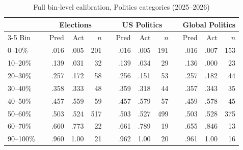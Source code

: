 \documentclass[11pt,a4paper]{article}
\begin{document}
\begin{table}[H]
\centering
\caption{Full bin-level calibration, Politics categories (2025--2026)}
\label{tab:appendix_politics}
\scriptsize
\begin{tabular}{lcrrrcrrrcrrr}
\toprule
& & \multicolumn{3}{c}{\textbf{Elections}} & & \multicolumn{3}{c}{\textbf{US Politics}} & & \multicolumn{3}{c}{\textbf{Global Politics}} \\
\cmidrule{3-5}\cmidrule{7-9}\cmidrule{11-13}
Bin & & Pred & Act & $n$ & & Pred & Act & $n$ & & Pred & Act & $n$ \\
\midrule
0--10\%  && .016 & .005 & 201 && .016 & .005 & 191 && .016 & .007 & 153 \\
10--20\% && .139 & .031 &  32 && .139 & .034 &  29 && .136 & .000 &  23 \\
20--30\% && .257 & .172 &  58 && .256 & .151 &  53 && .257 & .182 &  44 \\
30--40\% && .358 & .333 &  48 && .359 & .318 &  44 && .357 & .343 &  35 \\
40--50\% && .457 & .559 &  59 && .457 & .579 &  57 && .459 & .578 &  45 \\
50--60\% && .503 & .524 & 517 && .503 & .527 & 499 && .503 & .528 & 375 \\
60--70\% && .660 & .773 &  22 && .661 & .789 &  19 && .655 & .846 &  13 \\
90--100\%&& .960 & 1.00 &  21 && .962 & 1.00 &  20 && .961 & 1.00 &  16 \\
\bottomrule
\end{tabular}
\end{table}
\end{document}
